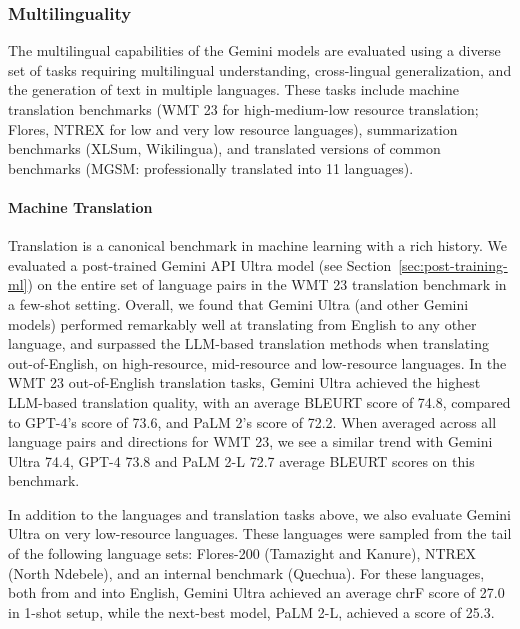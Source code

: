 \subsubsection{Multilinguality}
\label{sec:multilingual}
The multilingual capabilities of the Gemini models are evaluated using a diverse set of tasks requiring multilingual understanding, cross-lingual generalization, and the generation of text in multiple languages. These tasks include machine translation benchmarks (WMT 23 for high-medium-low resource translation; Flores, NTREX for low and very low resource languages), summarization benchmarks (XLSum, Wikilingua), and translated versions of common benchmarks (MGSM: professionally translated into 11 languages).

\paragraph{Machine Translation}
\label{sec:mt}
Translation is a canonical benchmark in machine learning with a rich history. We evaluated a post-trained Gemini API Ultra model (see Section~\ref{sec:post-training-ml}) on the entire set of language pairs in the WMT 23 translation benchmark in a few-shot setting. Overall, we found that Gemini Ultra (and other Gemini models) performed remarkably well at translating from English to any other language, and surpassed the LLM-based translation methods when translating out-of-English, on high-resource, mid-resource and low-resource languages. In the WMT 23 out-of-English translation tasks, Gemini Ultra achieved the highest LLM-based translation quality, with an average BLEURT \citep{sellam-etal-2020-bleurt} score of 74.8, compared to GPT-4’s score of 73.6, and PaLM 2’s score of 72.2. When averaged across all language pairs and directions for WMT 23, we see a similar trend with Gemini Ultra 74.4, GPT-4 73.8 and PaLM 2-L 72.7 average BLEURT scores on this benchmark. 

In addition to the languages and translation tasks above, we also evaluate Gemini Ultra on very low-resource languages. These languages were sampled from the tail of the following language sets: Flores-200 (Tamazight and Kanure), NTREX (North Ndebele), and an internal benchmark (Quechua). For these languages, both from and into English, Gemini Ultra achieved an average chrF score of 27.0 in 1-shot setup, while the next-best model, PaLM 2-L, achieved a score of 25.3.

